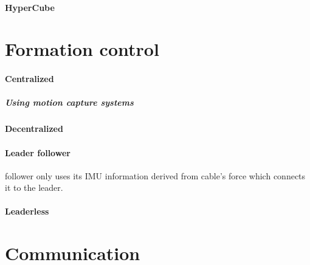 \documentclass{article}
\begin{document}
		\paragraph{HyperCube}
			\cite{masone-2016-cooperative-transportation-of-a-payload-using-quadrotors-a-reconfigurable-cable-driven-parallel-robot}
	\section{Formation control}
		\paragraph{Centralized}
			\cite{nguyen-2015-aerial-tool-operation-system-using-quadrotors-as-rotating-thrust-generators}
			\subparagraph{Using motion capture systems}
			\paragraph{Decentralized}
			
			\paragraph{Leader follower}
			\cite{tagliabue-2017-robust-collaborative-object-transportation-using-multiple-mavs}
			\cite{tagliabue-2017-collaborative-transportation-using-mavs-via-passive-force-control}
			\cite{gassner-2017-dynamic-collaboration-without-communication-vision-based-cable-suspended-load-transport-with-two-quadrotors}
			\cite{loianno-2017-cooperative-transportation-using-small-quadrotors-using-monocular-vision-and-inertial-sensing}
			\cite{wu-2020-cooperative-transportation-of-drones-without-inter-agent-communication}
			\cite{chen-2019-cooperative-transportation-of-cable-suspended-slender-payload-using-two-quadrotors}
			\cite{xie-2020-towards-cooperative-transport-of-a-suspended-payload-via-two-aerial-robots-with-inertial-sensing} follower only uses its IMU information derived from cable's force which connects it to the leader.
		\paragraph{Leaderless}
			\cite{mohammadi-2018-decentralized-motion-control-in-a-cabled-based-multi-drone-load-transport-system,mohammadi-2020-control-of-multiple-quad-copters-with-a-cable-suspended-payload-subject-to-disturbances}
			\cite{rezaee-2017-almost-sure-attitude-consensus-in-multispacecraft-systems-with-stochastic-communication-links}
	\section{Communication}
\end{document}
